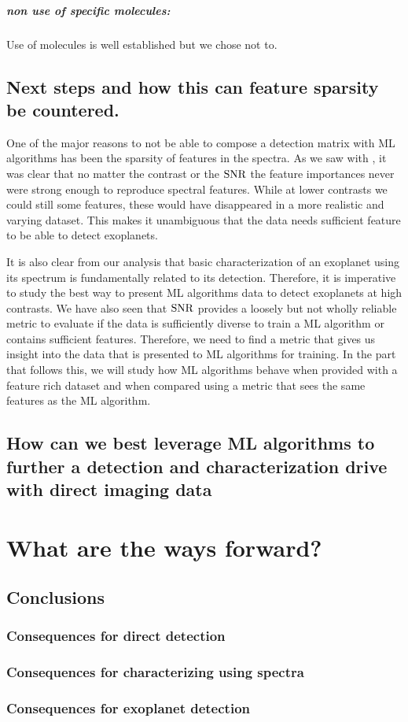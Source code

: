 \paragraph{non use of specific molecules:\\}
Use of molecules is well established but we chose not to.

\section{Next steps and how this can feature sparsity be countered.}
One of the major reasons to not be able to compose a detection matrix with ML algorithms has been the sparsity of features in the spectra.
As we saw with , it was clear that no matter the contrast or the $\rm{SNR}$ the feature importances never were strong enough to reproduce spectral features.
While at lower contrasts we could still some features, these would have disappeared in a more realistic and varying dataset.
This makes it unambiguous that the data needs sufficient feature to be able to detect exoplanets.

It is also clear from our analysis that basic characterization of an exoplanet using its spectrum is fundamentally related to its detection. 
Therefore, it is imperative to study the best way to present ML algorithms data to detect exoplanets at high contrasts.
We have also seen that $\rm{SNR}$ provides a loosely but not wholly reliable metric to evaluate if the data is sufficiently diverse to train a ML algorithm or contains sufficient features.
Therefore, we need to find a metric that gives us insight into the data that is presented to ML algorithms for training.
In the part that follows this, we will study how ML algorithms behave when provided with a feature rich dataset and when compared using a metric that sees the same features as the ML algorithm.

\section{How can we best leverage ML algorithms to further a detection and characterization drive with direct imaging data}
\chapter{What are the ways forward?}
\section{Conclusions}
\subsection{Consequences for direct detection}
\subsection{Consequences for characterizing using spectra}
\subsection{Consequences for exoplanet detection}